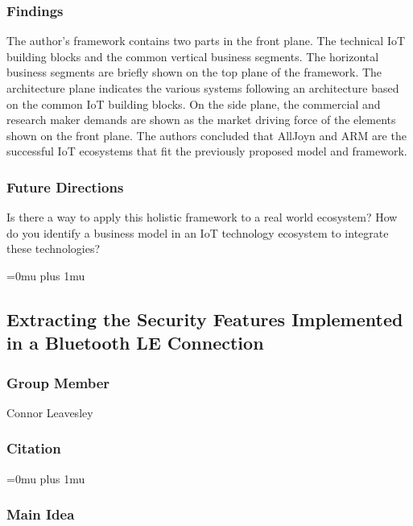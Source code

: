 \subsubsection{Findings}

\noindent
The author’s framework contains two parts in the front plane. The technical IoT building blocks and the common vertical business segments. The horizontal business segments are briefly shown on the top plane of the framework. The architecture plane indicates the various systems following an architecture based on the common IoT building blocks. On the side plane, the commercial and research maker demands are shown as the market driving force of the elements shown on the front plane. The authors concluded that AllJoyn and ARM are the successful IoT ecosystems that fit the previously proposed model and framework.

\subsubsection{Future Directions}

\noindent
Is there a way to apply this holistic framework to a real world ecosystem? How do you identify a business model in an IoT technology ecosystem to integrate these technologies?



\Urlmuskip=0mu plus 1mu\relax


\noindent
\subsection{Extracting the Security Features Implemented in a Bluetooth LE Connection}

\subsubsection{Group Member}

\noindent
Connor Leavesley

\noindent
\subsubsection{Citation}

\Urlmuskip=0mu plus 1mu\relax

\subsubsection{Main Idea}

